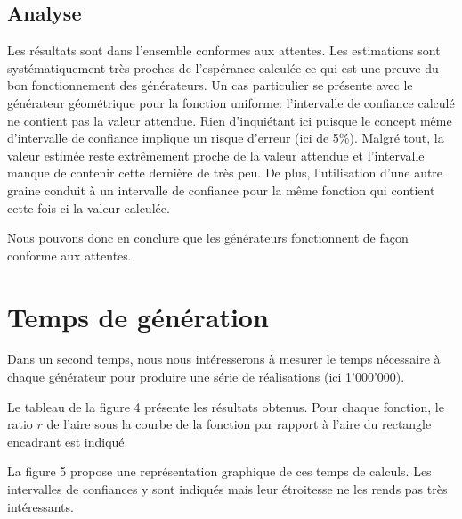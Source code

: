 \documentclass[a4paper,11pt]{article}
\begin{document}
\subsection{Analyse}

Les résultats sont dans l'ensemble conformes aux attentes. Les estimations sont systématiquement très proches de l'espérance calculée ce qui est une preuve du bon fonctionnement des générateurs. Un cas particulier se présente avec le générateur géométrique pour la fonction uniforme: l'intervalle de confiance calculé ne contient pas la valeur attendue. Rien d'inquiétant ici puisque le concept même d'intervalle de confiance implique un risque d'erreur (ici de 5\%). Malgré tout, la valeur estimée reste extrêmement proche de la valeur attendue et l'intervalle manque de contenir cette dernière de très peu. De plus, l'utilisation d'une autre graine conduit à un intervalle de confiance pour la même fonction qui contient cette fois-ci la valeur calculée.

Nous pouvons donc en conclure que les générateurs fonctionnent de façon conforme aux attentes.

\section{Temps de génération}

Dans un second temps, nous nous intéresserons à mesurer le temps nécessaire à chaque générateur pour produire une série de réalisations (ici 1'000'000).

Le tableau de la figure 4 présente les résultats obtenus. Pour chaque fonction, le ratio $r$ de l'aire sous la courbe de la fonction par rapport à l'aire du rectangle encadrant est indiqué.

La figure 5 propose une représentation graphique de ces temps de calculs. Les intervalles de confiances y sont indiqués mais leur étroitesse ne les rends pas très intéressants.
\end{document}

